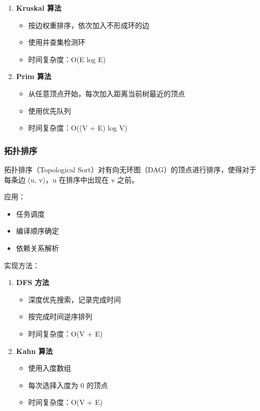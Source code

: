 \begin{enumerate}
  \item \textbf{Kruskal 算法}
    \begin{itemize}
      \item 按边权重排序，依次加入不形成环的边
      \item 使用并查集检测环
      \item 时间复杂度：O(E log E)
    \end{itemize}

  \item \textbf{Prim 算法}
    \begin{itemize}
      \item 从任意顶点开始，每次加入距离当前树最近的顶点
      \item 使用优先队列
      \item 时间复杂度：O((V + E) log V)
    \end{itemize}
\end{enumerate}

\subsubsection{拓扑排序}

拓扑排序（Topological Sort）对有向无环图（DAG）的顶点进行排序，使得对于每条边 (u, v)，u 在排序中出现在 v 之前。

应用：
\begin{itemize}
  \item 任务调度
  \item 编译顺序确定
  \item 依赖关系解析
\end{itemize}

实现方法：
\begin{enumerate}
  \item \textbf{DFS 方法}
    \begin{itemize}
      \item 深度优先搜索，记录完成时间
      \item 按完成时间逆序排列
      \item 时间复杂度：O(V + E)
    \end{itemize}

  \item \textbf{Kahn 算法}
    \begin{itemize}
      \item 使用入度数组
      \item 每次选择入度为 0 的顶点
      \item 时间复杂度：O(V + E)
    \end{itemize}
\end{enumerate}


